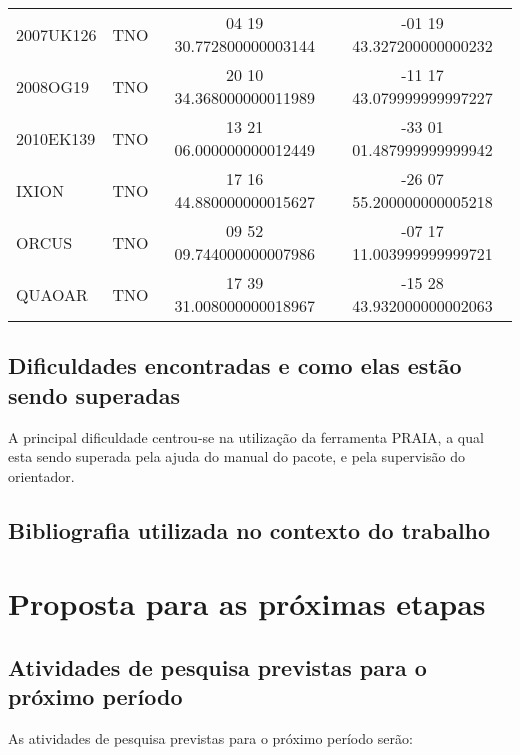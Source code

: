 \documentclass[a4paper, 11pt]{article}
\begin{document}
\begin{table}[!h]
\begin{center}
{\begin{tabular}{|l|c|c|c|}
2007UK126   &  TNO &  04 19 30.772800000003144 & -01 19 43.327200000000232 \\
2008OG19    &  TNO &  20 10 34.368000000011989 & -11 17 43.079999999997227 \\
2010EK139   &  TNO &  13 21 06.000000000012449 & -33 01 01.487999999999942 \\
IXION       &  TNO &  17 16 44.880000000015627 & -26 07 55.200000000005218 \\
ORCUS       &  TNO &  09 52 09.744000000007986 & -07 17 11.003999999999721 \\
QUAOAR      &  TNO &  17 39 31.008000000018967 & -15 28 43.932000000002063 \\
\hline

\end{tabular}}
\end{center}
\end{table}




\subsection{Dificuldades encontradas e como elas estão sendo superadas}
A principal dificuldade centrou-se na utilização da ferramenta PRAIA, a qual esta sendo superada pela ajuda do manual do pacote, e pela supervisão do orientador.  

\subsection{Bibliografia utilizada no contexto do trabalho}

\section{Proposta para as próximas etapas}

\subsection{Atividades de pesquisa previstas para o próximo período}
As atividades de pesquisa previstas para o pr\'oximo per\'iodo ser\~ao:
\end{document}
